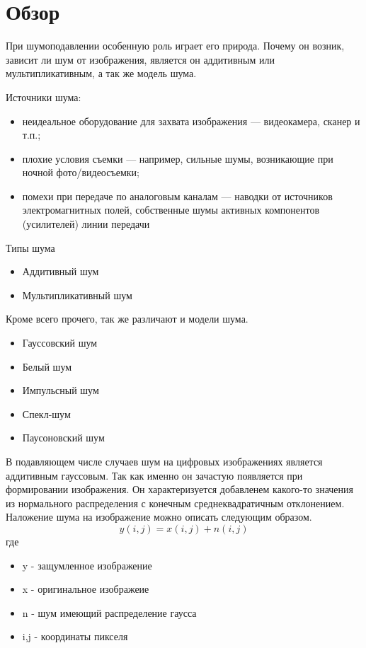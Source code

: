 \graphicspath{{../images/}}
\section{Обзор}
При шумоподавлении особенную роль играет его природа. Почему он возник, зависит ли шум от изображения, является он аддитивным
или мультипликативным, а так же модель шума. 

Источники шума\cite{Gonzalez}:
\begin{itemize}
	\item неидеальное оборудование для захвата изображения — видеокамера, сканер и
	т.п.;
	\item плохие условия съемки — например, сильные шумы, возникающие при
	ночной фото/видеосъемки;
	\item помехи при передаче по аналоговым каналам — наводки от источников
	электромагнитных полей, собственные шумы активных компонентов
	(усилителей) линии передачи
\end{itemize}

Типы шума
\begin{itemize}
	\item Аддитивный шум
	\item Мультипликативный шум
\end{itemize}

Кроме всего прочего, так же различают и модели шума.
\begin{itemize}
	\item Гауссовский шум
	\item Белый шум
	\item Импульсный шум
	\item Спекл-шум
	\item Паусоновский шум
\end{itemize}

В подавляющем числе случаев шум на цифровых изображениях является аддитивным гауссовым. Так
как именно он зачастую появляется при формировании изображения. Он характеризуется добавленем какого-то
значения из нормального распределения с конечным среднеквадратичным отклонением. Наложение шума
на изображение можно описать следующим образом.
\begin{equation}\label{eModelNoise}
	y(i,j)=x(i,j)+n(i,j)
\end{equation}
где
\begin{itemize}
	\item y - защумленное изображение
	\item x - оригинальное изображеие
	\item n - шум имеющий распределение гаусса
	\item i,j - координаты пикселя
\end{itemize}

